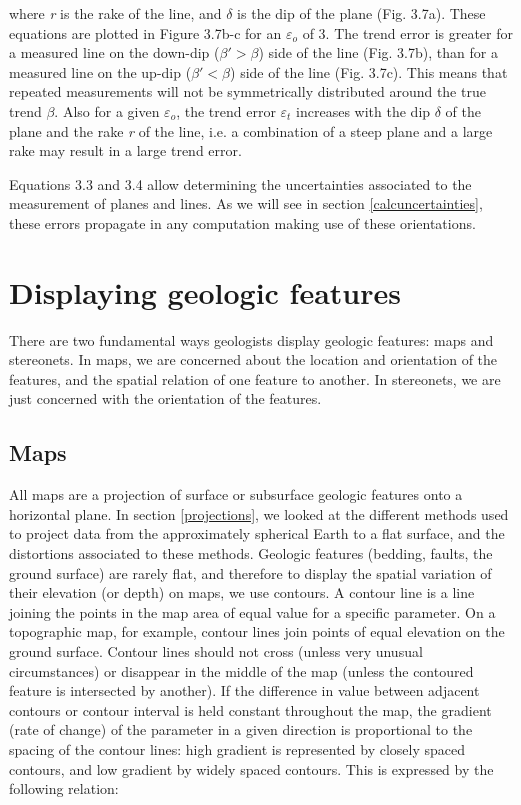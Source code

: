 \documentclass[a4paper , 12pt]{book}
\begin{document}
where \textit{r} is the rake of the line, and $\delta$ is the dip of the plane (Fig. 3.7a). These equations are plotted in Figure 3.7b-c for an $\varepsilon_o$ of 3\degree. The trend error is greater for a measured line on the down-dip ($\beta\text{$'$} > \beta$) side of the line (Fig. 3.7b), than for a measured line on the up-dip ($\beta\text{$'$} < \beta$) side of the line (Fig. 3.7c). This means that repeated measurements will not be symmetrically distributed around the true trend $\beta$. Also for a given $\varepsilon_o$, the trend error $\varepsilon_t$ increases with the dip $\delta$ of the plane and the rake \textit{r} of the line, i.e. a combination of a steep plane and a large rake may result in a large trend error.

Equations 3.3 and 3.4 allow determining the uncertainties associated to the measurement of planes and lines. As we will see in section \ref{calcuncertainties}, these errors propagate in any computation making use of these orientations.

\section{Displaying geologic features}

There are two fundamental ways geologists display geologic features: maps and stereonets. In maps, we are concerned about the location and orientation of the features, and the spatial relation of one feature to another. In stereonets, we are just concerned with the orientation of the features.

\subsection{Maps}

All maps are a projection of surface or subsurface geologic features onto a horizontal plane. In section \ref{projections}, we looked at the different methods used to project data from the approximately spherical Earth to a flat surface, and the distortions associated to these methods. Geologic features (bedding, faults, the ground surface) are rarely flat, and therefore to display the spatial variation of their elevation (or depth) on maps, we use contours. A contour line is a line joining the points in the map area of equal value for a specific parameter. On a topographic map, for example, contour lines join points of equal elevation on the ground surface. Contour lines should not cross (unless very unusual circumstances) or disappear in the middle of the map (unless the contoured feature is intersected by another). If the difference in value between adjacent contours or contour interval is held constant throughout the map, the gradient (rate of change) of the parameter in a given direction is proportional to the spacing of the contour lines: high gradient is represented by closely spaced contours, and low gradient by widely spaced contours. This is expressed by the following relation:
\end{document}
